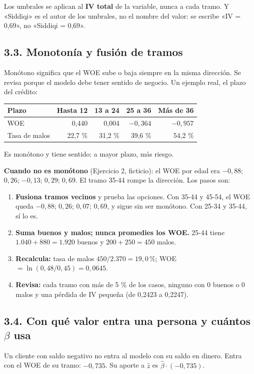 \documentclass[11pt,letterpaper]{article}
\newcommand{\tema}[1]{\subsection*{#1}}
\newcommand{\zh}{\hat{z}}
\begin{document}
\begin{trampa}
Los umbrales se aplican al \textbf{IV total} de la variable, nunca a cada tramo. Y «Siddiqi» es el autor de los umbrales, no el nombre del valor: se escribe «IV = 0,69», no «Siddiqi = 0,69».
\end{trampa}

\tema{3.3. Monotonía y fusión de tramos}

Monótono significa que el WOE sube o baja siempre en la misma dirección. Se revisa porque el modelo debe tener sentido de negocio. Un ejemplo real, el plazo del crédito:

\begin{center}
\begin{tabular}{lrrrr}
\toprule
\textbf{Plazo} & Hasta 12 & 13 a 24 & 25 a 36 & Más de 36 \\
\midrule
WOE & 0,440 & 0,004 & $-0{,}364$ & $-0{,}957$ \\
Tasa de malos & 22,7 \% & 31,2 \% & 39,6 \% & 54,2 \% \\
\bottomrule
\end{tabular}
\end{center}

Es monótono y tiene sentido: a mayor plazo, más riesgo.

\textbf{Cuando no es monótono} (Ejercicio 2, ficticio): el WOE por edad era $-0{,}88$; $0{,}26$; $-0{,}13$; $0{,}29$; $0{,}69$. El tramo 35-44 rompe la dirección. Los pasos son:

\begin{enumerate}
  \item \textbf{Fusiona tramos vecinos} y prueba las opciones. Con 35-44 y 45-54, el WOE queda $-0{,}88$; $0{,}26$; $0{,}07$; $0{,}69$, y sigue sin ser monótono. Con 25-34 y 35-44, sí lo es.
  \item \textbf{Suma buenos y malos; nunca promedies los WOE.} 25-44 tiene $1.040+880=1.920$ buenos y $200+250=450$ malos.
  \item \textbf{Recalcula:} tasa de malos $450/2.370=19{,}0\,\%$; WOE $=\ln(0{,}48/0{,}45)=0{,}0645$.
  \item \textbf{Revisa:} cada tramo con más de 5 \% de los casos, ninguno con 0 buenos o 0 malos y una pérdida de IV pequeña (de 0,2423 a 0,2247).
\end{enumerate}

\tema{3.4. Con qué valor entra una persona y cuántos $\beta$ usa}

Un cliente con saldo negativo no entra al modelo con su saldo en dinero. Entra con el WOE de su tramo: $-0{,}735$. Su aporte a $\zh$ es $\hat\beta\cdot(-0{,}735)$.
\end{document}
